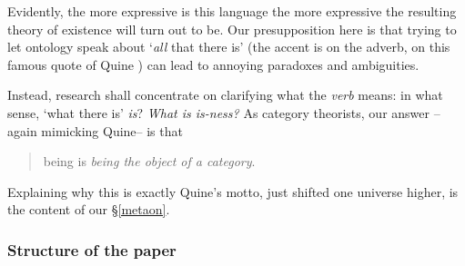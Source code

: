 Evidently, the more expressive is this language the more expressive the resulting theory of existence will turn out to be. Our presupposition here is that trying to let ontology speak about `\emph{all} that there is' (the accent is on the adverb, on this famous quote of Quine \cite{quine1948there}) can lead to annoying paradoxes and ambiguities. 

Instead, research shall concentrate on clarifying what the \emph{verb} means: in what sense, `what there is' \emph{is}? \emph{What is is-ness?} As category theorists, our answer --again mimicking Quine-- is that
\begin{quote}
	being is \emph{being the object of a category}.
\end{quote}
Explaining why this is exactly Quine's motto, just shifted one universe higher, is the content of our §\ref{metaon}.
\subsubsection{Structure of the paper}


